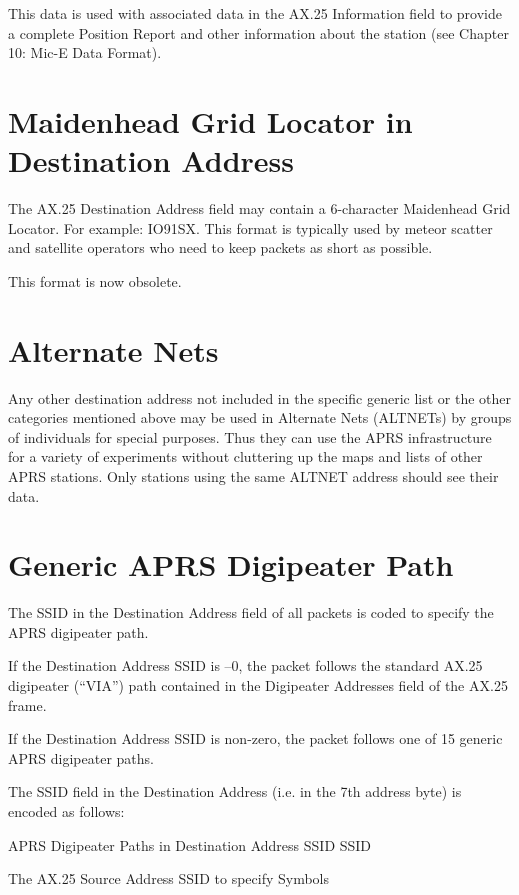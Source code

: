 This data is used with associated data in the AX.25 Information field to
provide a complete Position Report and other information about the station
(see Chapter 10: Mic-E Data Format).

\section {Maidenhead Grid Locator in Destination Address}

The AX.25 Destination Address field may contain a 6-character Maidenhead
Grid Locator. For example: IO91SX. This format is typically used by meteor
scatter and satellite operators who need to keep packets as short as possible.

This format is now obsolete.

\section{Alternate Nets}

Any other destination address not included in the specific generic list or the
other categories mentioned above may be used in Alternate Nets (ALTNETs)
by groups of individuals for special purposes. Thus they can use the APRS
infrastructure for a variety of experiments without cluttering up the maps and
lists of other APRS stations. Only stations using the same ALTNET address
should see their data.

\section{Generic APRS Digipeater Path}


The SSID in the Destination Address field of all packets is coded to specify
the APRS digipeater path.

If the Destination Address SSID is –0, the packet follows the standard AX.25
digipeater (“VIA”) path contained in the Digipeater Addresses field of the
AX.25 frame.

If the Destination Address SSID is non-zero, the packet follows one of 15
generic APRS digipeater paths.


The SSID field in the Destination Address (i.e. in the 7th address byte) is
encoded as follows:


APRS Digipeater Paths in Destination Address SSID
SSID

The AX.25 Source
Address SSID to
specify Symbols

